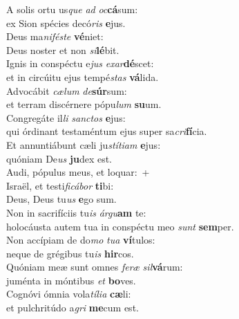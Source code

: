 \evenverse A solis ortu us\textit{que} \textit{ad} \textit{oc}\textbf{cá}sum:~\*\\
\evenverse ex Sion spécies decó\textit{ris} \textbf{e}jus.\\
\oddverse Deus ma\textit{ni}\textit{fé}\textit{ste} \textbf{vé}niet:~\*\\
\oddverse Deus noster et non \textit{si}\textbf{lé}bit.\\
\evenverse Ignis in conspéctu e\textit{jus} \textit{e}\textit{xar}\textbf{dé}scet:~\*\\
\evenverse et in circúitu ejus tempé\textit{stas} \textbf{vá}lida.\\
\oddverse Advocábit \textit{cæ}\textit{lum} \textit{de}\textbf{súr}sum:~\*\\
\oddverse et terram discérnere pópu\textit{lum} \textbf{su}um.\\
\evenverse Congregáte il\textit{li} \textit{san}\textit{ctos} \textbf{e}jus:~\*\\
\evenverse qui órdinant testaméntum ejus super sa\textit{cri}\textbf{fí}cia.\\
\oddverse Et annuntiábunt cæli ju\textit{stí}\textit{ti}\textit{am} \textbf{e}jus:~\*\\
\oddverse quóniam De\textit{us} \textbf{ju}dex est.\\
\evenverse Audi, pópulus meus, et loquar:~+\\
\evenverse  Israël, et testi\textit{fi}\textit{cá}\textit{bor} \textbf{ti}bi:~\*\\
\evenverse Deus, Deus tu\textit{us} \textbf{e}go sum.\\
\oddverse Non in sacrifíciis tu\textit{is} \textit{ár}\textit{gu}\textbf{am} te:~\*\\
\oddverse holocáusta autem tua in conspéctu meo \textit{sunt} \textbf{sem}per.\\
\evenverse Non accípiam de do\textit{mo} \textit{tu}\textit{a} \textbf{ví}tulos:~\*\\
\evenverse neque de grégibus tu\textit{is} \textbf{hir}cos.\\
\oddverse Quóniam meæ sunt omnes \textit{fe}\textit{ræ} \textit{sil}\textbf{vá}rum:~\*\\
\oddverse juménta in móntibus \textit{et} \textbf{bo}ves.\\
\evenverse Cognóvi ómnia vola\textit{tí}\textit{li}\textit{a} \textbf{cæ}li:~\*\\
\evenverse et pulchritúdo a\textit{gri} \textbf{me}cum est.\\
